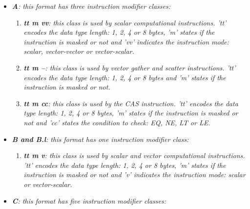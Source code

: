             \begin{itemize}

                \item \textit{\textbf{A}: this format has three instruction modifier classes:}

                    \begin{enumerate}

                        \item \textit{\textbf{tt m vv}: this class is used by scalar computational instructions. 'tt' encodes the data type length: 1, 2, 4 or 8 bytes, 'm' states if the instruction is masked or not and 'vv' indicates the instruction mode: scalar, vector-vector or vector-scalar.}

                        \item \textit{\textbf{tt m --}: this class is used by vector gather and scatter instructions. 'tt' encodes the data type length: 1, 2, 4 or 8 bytes and 'm' states if the instruction is masked or not.}

                        \item \textit{\textbf{tt m cc}: this class is used by the CAS instruction. 'tt' encodes the data type length: 1, 2, 4 or 8 bytes, 'm' states if the instruction is masked or not and 'cc' states the condition to check: EQ, NE, LT or LE.}

                    \end{enumerate}

                \item \textit{\textbf{B and B.l}: this format has one instruction modifier class:}

                    \begin{enumerate}

                        \item \textit{\textbf{tt m v}: this class is used by scalar and vector computational instructions. 'tt' encodes the data type length: 1, 2, 4 or 8 bytes, 'm' states if the instruction is masked or not and 'v' indicates the instruction mode: scalar or vector-scalar.}

                    \end{enumerate}

                \item \textit{\textbf{C}: this format has five instruction modifier classes:}

                    \begin{enumerate}


\end{enumerate}
\end{itemize}
